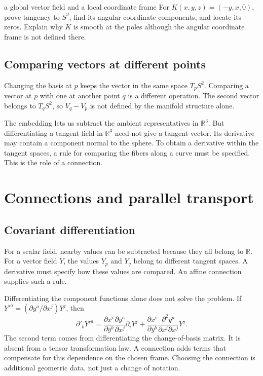 \documentclass[11pt,a4paper]{article}
\numberwithin{equation}{section}
\newcommand{\R}{\mathbb R}
\newcommand{\slideref}[1]{\par\nobreak\smallskip\nobreak{\footnotesize\color{ink!60}\textsc{Source slide #1}}\par\nobreak\smallskip\nobreak}
\begin{document}
\begin{studentwork}[3.7cm]{a global vector field and a local coordinate frame}
For \(K(x,y,z)=(-y,x,0)\), prove tangency to \(S^2\), find its angular
coordinate components, and locate its zeros. Explain why \(K\) is smooth
at the poles although the angular coordinate frame is not defined there.
\end{studentwork}

\subsection{Comparing vectors at different points}
\slideref{13}

Changing the basis at \(p\) keeps the vector in the same space
\(T_pS^2\). Comparing a vector at \(p\) with one at another point \(q\)
is a different operation. The second vector belongs to \(T_qS^2\), so
\(V_q-V_p\) is not defined by the manifold structure alone.

The embedding lets us subtract the ambient representatives in \(\R^3\).
But differentiating a tangent field in \(\R^3\) need not give a tangent
vector. Its derivative may contain a component normal to the sphere.
To obtain a derivative within the tangent spaces, a rule for comparing
the fibers along a curve must be specified. This is the role of a
connection.


\section{Connections and parallel transport}
\label{sec:connections}
\slideref{14}

\subsection{Covariant differentiation}

For a scalar field, nearby values can be subtracted because they all
belong to \(\R\). For a vector field \(Y\), the values \(Y_p\) and
\(Y_q\) belong to different tangent spaces. A derivative must specify
how these values are compared. An affine connection supplies such a
rule.

Differentiating the component functions alone does not solve the problem.
If \(Y'^a=(\partial y^a/\partial x^j)Y^j\), then
\[
 \partial'_bY'^a
 =\frac{\partial x^i}{\partial y^b}
   \frac{\partial y^a}{\partial x^j}\partial_iY^j
  +\frac{\partial x^i}{\partial y^b}
   \frac{\partial^2y^a}{\partial x^i\partial x^j}Y^j.
\]
The second term comes from differentiating the change-of-basis matrix.
It is absent from a tensor transformation law. A connection adds terms
that compensate for this dependence on the chosen frame. Choosing the
connection is additional geometric data, not just a change of notation.
\end{document}
